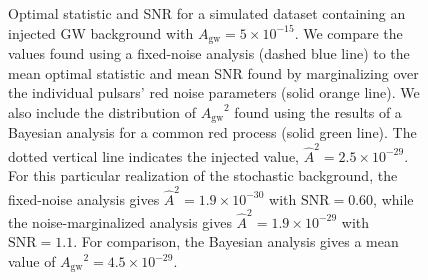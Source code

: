 \documentclass[twocolumn,aps,prd,superscriptaddress]{revtex4-1}
\newcommand{\Agw}{\ensuremath{A_\mathrm{gw}}}
\begin{document}
\begin{figure}[ht]
	\caption{Optimal statistic and SNR for a simulated dataset 
			containing an injected GW background with $\Agw = 5\times10^{-15}$. 
			We compare the values found using a fixed-noise analysis (dashed blue line) to the 
			mean optimal statistic and mean SNR found by marginalizing over 
			the individual pulsars' red noise parameters (solid orange line). 
			We also include the distribution of $\Agw^2$ found using the results of a Bayesian analysis 
			for a common red process (solid green line). 
			The dotted vertical line indicates the injected value, $\hat{A}^2 = 2.5 \times 10^{-29}$. 
			For this particular realization of the stochastic background, the fixed-noise analysis 
			gives $\hat{A}^2 = 1.9 \times 10^{-30}$ with $\mathrm{SNR} = 0.60$, 
			while the noise-marginalized analysis gives $\hat{A}^2 = 1.9\times10^{-29}$ with $\mathrm{SNR} = 1.1$. 
			For comparison, the Bayesian analysis gives a mean value of $\Agw^2 = 4.5\times10^{-29}$.}
	\label{fig:os_dataset_sample}
\end{figure}
\end{document}
